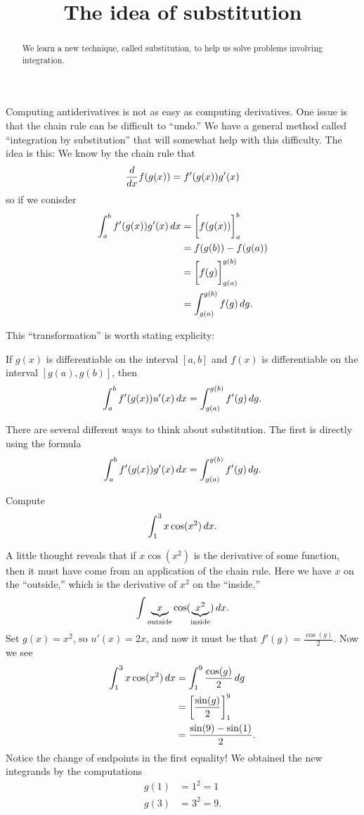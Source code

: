 \documentclass{ximera}
\title[Dig-In:]{The idea of substitution}
\begin{document}
\begin{abstract}
  We learn a new technique, called substitution, to help us solve
  problems involving integration.
\end{abstract}
\maketitle


Computing antiderivatives is not as easy as computing derivatives.
One issue is that the chain rule can be difficult to ``undo.''  We
have a general method called ``integration by substitution'' that will
somewhat help with this difficulty. The idea is this: We know by the
chain rule that
\[
\frac{d}{dx} f(g(x)) = f'(g(x))g'(x)
\]
so if we conisder
\begin{align*}
  \int_a^b f'(g(x))g'(x) \,d x &= \bigg[ f(g(x)) \bigg]_a^b \\
  &= f(g(b)) - f(g(a)) \\
  &= \bigg[ f(g) \bigg]_{g(a)}^{g(b)}\\
  &= \int_{g(a)}^{g(b)}f(g) \,d g.
\end{align*}

This ``transformation'' is worth stating explicity:

\begin{theorem} 
If $g(x)$ is differentiable on the interval $[a,b]$ and $f(x)$ is
differentiable on the interval $[g(a),g(b)]$, then
\[
\int_a^b f'(g(x)) u'(x) \,d x =\int_{g(a)}^{g(b)} f'(g) \,d g.
\]
\end{theorem}

There are several different ways to think about substitution. The
first is directly using the formula
\[
\int_a^b f'(g(x)) g'(x) \,d x = \int_{g(a)}^{g(b)} f'(g) \,d g.
\]
\begin{example}
Compute
\[
\int_1^3 x\cos(x^2)\,d x.
\]
\begin{explanation}
A little thought reveals that if $x\cos(x^2)$ is the derivative of
some function, then it must have come from an application of the chain
rule. Here we have $x$ on the ``outside,'' which is the derivative of
$x^2$ on the ``inside,'' 
\[
\int \underbrace{x}_{\text{outside}}\cos(\underbrace{x^2}_{\text{inside}})\,d x.
\]
Set $g(x) = x^2$, so $u'(x) = 2x$, and now it must be that $f'(g) =
\frac{\cos(g)}{2}$. Now we see
\begin{align*}
\int_1^3 x\cos(x^2)\,d x &= \int_1^9 \frac{\cos(g)}{2}\,d g\\
&= \bigg[ \frac{\sin(g)}{2} \bigg]_1^9 \\
&= \frac{\sin(9) -\sin(1)}{2}.
\end{align*}
Notice the change of endpoints in the first equality!  
We obtained the new integrands by the computations
\begin{align*}
g(1) &= 1^2 = 1  \\
g(3) &= 3^2 = 9.
\end{align*}
\end{explanation}
\end{example}
\end{document}
